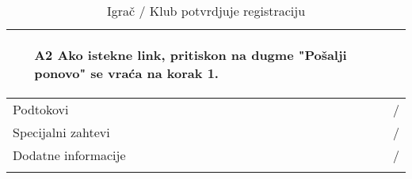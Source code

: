 \documentclass{article}
\begin{document}
\begin{longtable}{| p{} | p{} |}
\begin{enumerate}
                    \item[A2] Ako istekne link, pritiskon na dugme "Pošalji ponovo" se vraća na korak 1.
                \end{enumerate}\\
            \hline
                Podtokovi & /\\
            \hline
                Specijalni zahtevi & /\\
            \hline
                Dodatne informacije & / \\
            \hline
            \caption{Igrač / Klub potvrdjuje registraciju}
        \end{longtable}
\end{document}
